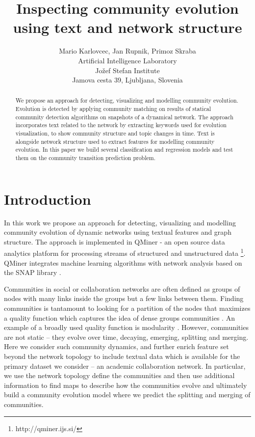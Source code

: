 \documentclass{article} %
\title{Inspecting community evolution using text and network structure}
\author{
Mario Karlovcec, Jan Rupnik, Primoz Skraba \\
Artificial Intelligence Laboratory\\
Jožef Stefan Institute\\
Jamova cesta 39, Ljubljana, Slovenia \\
}
\begin{document}
\maketitle
\begin{abstract}
We propose an approach for detecting, visualizing and modelling community evolution.
Evolution is detected by applying community matching on results of statical community detection algorithms on snapshots of a dynamical network.
The approach incorporates text related to the network by extracting keywords used for evolution visualization, to show community structure and topic changes in time. Text is alongside network structure used to extract features for modelling community evolution. In this paper we build several classification and regression models and test them on the community transition prediction problem.
\end{abstract}

\section{Introduction}
In this work we propose an approach for detecting, visualizing and
modelling community evolution of dynamic networks using textual
features and graph structure. The approach is implemented in QMiner -
an open source data analytics platform for processing streams of
structured and unstructured data \footnote{http://qminer.ijs.si/}.
QMiner integrates machine learning algorithms with network analysis
based on the SNAP library \cite{snap}.


Communities in social or collaboration networks are often defined as
groups of nodes with many links inside the groups but a few links
between them. Finding communities is tantamount to looking for a
partition of the nodes that maximizes a quality function which
captures the idea of dense groups communities \cite{aynaud}. An
example of a broadly used quality function is modularity
\cite{newman2003}. However, communities are not static -- they evolve
over time, decaying, emerging, splitting and merging. Here we consider
such community dynamics, and further enrich feature set beyond the
network topology to include textual data which is available for the
primary dataset we consider -- an academic collaboration network. In particular, we use
the network topology define the communities and then use additional
information to find maps to describe how the communities evolve and
ultimately build a community evolution model where we predict the
splitting and merging of communities.
\end{document}
